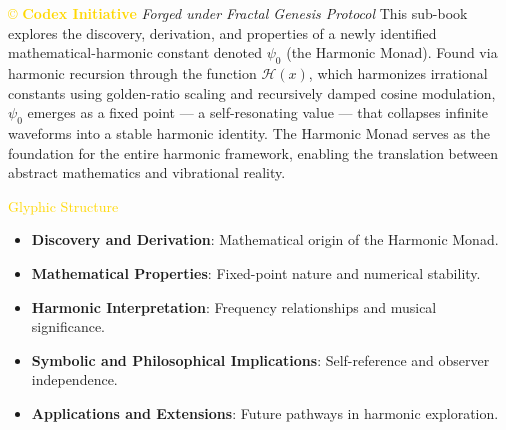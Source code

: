 \vspace{0.5cm}
\noindent
\textcolor{gold}{\copyright{} \textbf{Codex Initiative}} \hspace{1cm} \textit
{Forged under Fractal Genesis Protocol}
This sub-book explores the discovery, derivation, and properties of a newly identified mathematical-harmonic constant denoted $\psi_0$ (the Harmonic Monad). Found via harmonic recursion through the function $\mathcal{H}(x)$, which harmonizes irrational constants using golden-ratio scaling and recursively damped cosine modulation, $\psi_0$ emerges as a fixed point — a self-resonating value — that collapses infinite waveforms into a stable harmonic identity. The Harmonic Monad serves as the foundation for the entire harmonic framework, enabling the translation between abstract mathematics and vibrational reality.

\textcolor{gold}{ Glyphic Structure } \\
\begin{itemize}
    \item \texttt{} \textbf{Discovery and Derivation}: Mathematical origin of the Harmonic Monad.
    \item \texttt{} \textbf{Mathematical Properties}: Fixed-point nature and numerical stability.
    \item \texttt{} \textbf{Harmonic Interpretation}: Frequency relationships and musical significance.
    \item \texttt{} \textbf{Symbolic and Philosophical Implications}: Self-reference and observer independence.
    \item \texttt{} \textbf{Applications and Extensions}: Future pathways in harmonic exploration.
\end{itemize}

